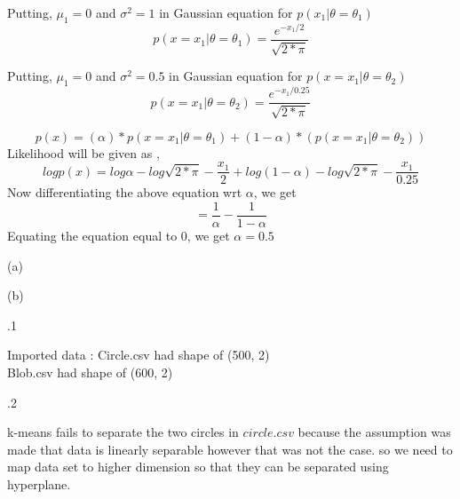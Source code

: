 \documentclass[12pt]{article}
\newenvironment{problem}[2][Problem]{\begin{trivlist}
\item[\hskip \labelsep {\bfseries #1}\hskip \labelsep {\bfseries #2.}]}{\end{trivlist}}
\begin{document}
\begin{problem} 2
\end{problem}
\begin{Answer}
Putting, $\mu_{1} = 0$ and $\sigma^2=1$ in Gaussian equation for $p(x_{1}|\theta=\theta_{1})$
\begin{equation}
p(x=x_{1}|\theta=\theta_{1}) = \frac {e^{-x_{1}/2}}{\sqrt {2*\pi}}    
\end{equation}

Putting, $\mu_{1} = 0$ and $\sigma^2=0.5$ in Gaussian equation for $p(x=x_{1}|\theta=\theta_{2})$
\begin{equation}
p(x=x_{1}|\theta=\theta_{2}) = \frac {e^{-x_{1}/0.25}}{\sqrt {2*\pi}}   
\end{equation}

\begin{equation}
p(x) = (\alpha) * p(x=x_{1}|\theta=\theta_{1}) + (1 - \alpha) * (p(x=x_{1}|\theta=\theta_{2}))
\end{equation}
Likelihood will be given as , 
\begin{equation}
log p(x) = log \alpha - log \sqrt{2*\pi} - \frac{x_{1}}{2} + log (1 - \alpha) - log \sqrt{2*\pi} - \frac{x_{1}}{0.25}
\end{equation}
Now differentiating the above equation wrt $\alpha$, we get 
\begin{equation}
 = \frac{1}{\alpha} - \frac{1}{ 1 - \alpha}
\end{equation}
Equating the equation equal to 0, we get $\alpha = 0.5$
\end{Answer}

\begin{problem} 3 (a)
\end{problem}
\begin{Answer}
\end{Answer}

\begin{problem} 3 (b)
\end{problem}
\begin{Answer}
\end{Answer}

\begin{problem} 4.1
\end{problem}
\begin{Answer}
Imported data : Circle.csv had shape of (500, 2) \\
Blob.csv had shape of (600, 2)
\end{Answer}

\begin{problem} 4.2
\end{problem}
\begin{Answer}
k-means fails to separate the two circles in $circle.csv$ because the assumption was made that data is linearly separable however that was not the case. so we need to map data set to higher dimension so that they can be separated using hyperplane.
\end{Answer}
\end{document}
